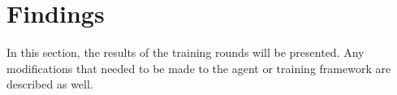 \section{Findings}
\label{sec:findings}

In this section,
the results of the training rounds will be presented.
%
Any modifications that needed to be made to the agent or training framework
are described as well.







